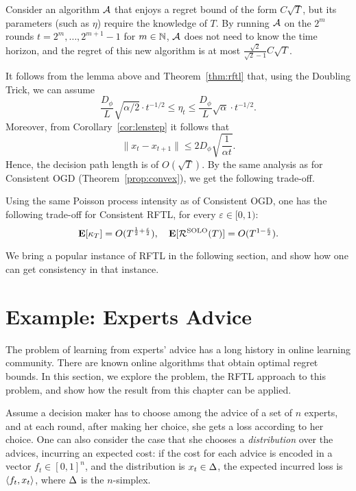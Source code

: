\begin{lemma}
    Consider an algorithm $\mathcal{A}$ that enjoys a regret bound of the form $C\sqrt{T}$, but its parameters (such as $\eta$) require the knowledge of $T$. By running $\mathcal{A}$ on the $2^m$ rounds $t = 2^m,\ldots,2^{m+1} -1$ for $m\in \mathbb{N}$, $\mathcal{A}$ does not need to know the time horizon, and the regret of this new algorithm is at most $\frac{\sqrt{2}}{\sqrt{2} - 1}C\sqrt{T}$.
\end{lemma}

It follows from the lemma above and Theorem~\ref{thm:rftl} that, using the Doubling Trick, we can assume 
\[
    \frac{D_\phi}{L} \sqrt{\alpha/2}\cdot t^{-1/2} \leq \eta_t \leq \frac{D_\phi}{L} \sqrt{\alpha} \cdot t^{-1/2}.
\]
Moreover, from Corollary~\ref{cor:lenstep} it follows that 
\[
    \|x_t - x_{t+1}\| \leq  2D_\phi \sqrt{\frac{1}{\alpha t}}.
\]
Hence, the decision path length is of $O(\sqrt{T})$. By the same analysis as for Consistent OGD (Theorem~\ref{prop:convex}), we get the following trade-off.
\begin{theorem}
    Using the same Poisson process intensity as of Consistent OGD, one has the following trade-off for Consistent RFTL, for every $\varepsilon \in [0, 1)$:
   \[
      \mathbf{E}[\kappa_T] = O(T^{\frac{1}{2}+\frac{\varepsilon}{2}}),\quad \mathbf{E}[\mathcal{R}^{\mathrm{SOLO}}(T)] = O(T^{1-\frac{\varepsilon}{2}}).
   \]
 
\end{theorem}

We bring a popular instance of RFTL in the following section, and show how one can get consistency in that instance.

\section{Example: Experts Advice}\label{sec:experts}
The problem of learning from experts' advice has a long history in online learning community. There are known online algorithms that obtain optimal regret bounds. In this section, we explore the problem, the RFTL approach to this problem, and show how the result from this chapter can be applied.

Assume a decision maker has to choose among the advice of a set of $n$ experts, and at each round, after making her choice, she gets a loss according to her choice. One can also consider the case that she chooses a \emph{distribution} over the advices, incurring an expected cost: if the cost for each advice is encoded in a vector $f_t\in [0,1]^n$, and the distribution is $x_t\in\Delta$, the expected incurred loss is $\left\langle f_t,x_t \right\rangle$, where $\Delta$ is the $n$-simplex.

